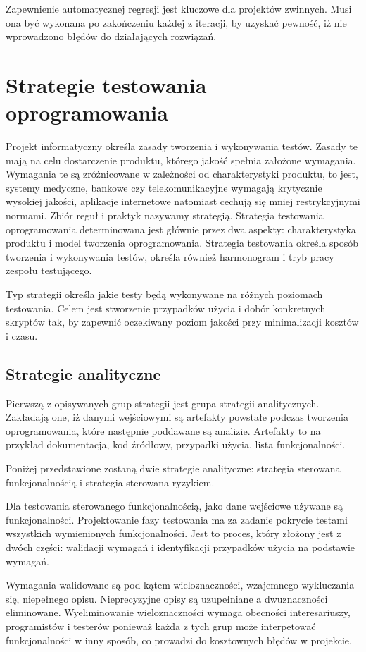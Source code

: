 Zapewnienie automatycznej regresji jest kluczowe dla projektów zwinnych. Musi ona być wykonana po zakończeniu każdej z iteracji, by uzyskać pewność, iż nie wprowadzono błędów do działających rozwiązań.

\section{Strategie testowania oprogramowania}
\label{cha:strategie testowania}
Projekt informatyczny określa zasady tworzenia i wykonywania testów. Zasady te mają na celu dostarczenie produktu, którego jakość spełnia założone wymagania. Wymagania te są zróżnicowane w zależności od charakterystyki produktu, to jest, systemy medyczne, bankowe czy telekomunikacyjne wymagają krytycznie wysokiej jakości, aplikacje internetowe natomiast cechują się mniej restrykcyjnymi normami. Zbiór reguł i praktyk nazywamy strategią. Strategia testowania oprogramowania determinowana jest głównie przez dwa aspekty: charakterystyka produktu i model tworzenia oprogramowania. 
Strategia testowania określa sposób tworzenia i wykonywania testów, określa również harmonogram i tryb pracy zespołu testującego.

Typ strategii określa jakie testy będą wykonywane na różnych poziomach testowania. Celem jest stworzenie przypadków użycia i dobór konkretnych skryptów tak, by zapewnić oczekiwany poziom jakości przy minimalizacji kosztów i czasu.
\subsection{Strategie analityczne}
Pierwszą z opisywanych grup strategii jest grupa strategii analitycznych. Zakładają one, iż danymi wejściowymi są artefakty powstałe podczas tworzenia oprogramowania, które następnie poddawane są analizie. Artefakty to na przykład dokumentacja, kod źródłowy, przypadki użycia, lista funkcjonalności.

Poniżej przedstawione zostaną dwie strategie analityczne: strategia sterowana funkcjonalnością i strategia sterowana ryzykiem. 

Dla testowania sterowanego funkcjonalnością, jako dane wejściowe używane są funkcjonalności. Projektowanie fazy testowania ma za zadanie pokrycie testami wszystkich wymienionych funkcjonalności. Jest to proces, który złożony jest z dwóch części: walidacji wymagań i identyfikacji przypadków użycia na podstawie wymagań. 

Wymagania walidowane są pod kątem wieloznaczności, wzajemnego wykluczania się, niepełnego opisu. Nieprecyzyjne opisy są uzupełniane a dwuznaczności eliminowane. Wyeliminowanie wieloznaczności wymaga obecności interesariuszy, programistów i testerów ponieważ każda z tych grup może interpetować funkcjonalności w inny sposób, co prowadzi do kosztownych błędów w projekcie.

